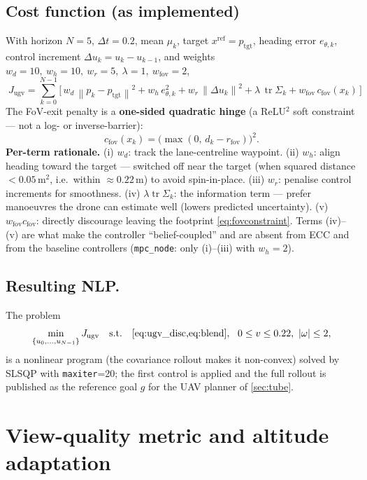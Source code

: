\documentclass[11pt]{article}
\DeclareMathOperator{\tr}{tr}
\newcommand{\norm}[1]{\left\lVert #1 \right\rVert}
\newcommand{\code}[1]{\texttt{#1}}
\newcommand{\fov}{\mathrm{fov}}
\begin{document}
\subsection{Cost function (as implemented)}
With horizon $N=5$, $\Delta t=0.2$, mean $\mu_k$, target $x^{\text{ref}}=p_{\text{tgt}}$, heading error
$e_{\theta,k}$, control increment $\Delta u_k=u_k-u_{k-1}$, and weights $w_d=10,\ w_h=10,\ w_r=5,\ \lambda=1,\
w_{\fov}=2$,
\begin{equation}
\boxed{\;
J_{\text{ugv}} = \sum_{k=0}^{N-1}\Big[\,
w_d\,\norm{p_k-p_{\text{tgt}}}^2
+ w_h\,e_{\theta,k}^2
+ w_r\,\norm{\Delta u_k}^2
+ \lambda\,\tr\Sigma_k
+ w_{\fov}\,c_{\fov}(x_k)\,\Big]\;}
\label{eq:ugvcost}
\end{equation}
The FoV-exit penalty is a \textbf{one-sided quadratic hinge} (a ReLU$^2$ soft constraint --- not a log- or
inverse-barrier):
\begin{equation}
c_{\fov}(x_k) = \big(\max(0,\,d_k-r_{\fov})\big)^2 .
\label{eq:cfov}
\end{equation}
\textbf{Per-term rationale.} (i) $w_d$: track the lane-centreline waypoint. (ii) $w_h$: align heading toward
the target --- switched off near the target (when squared distance $<0.05$\,m$^2$, i.e.\ within $\approx0.22$\,m)
to avoid spin-in-place. (iii) $w_r$: penalise control increments for smoothness. (iv) $\lambda\tr\Sigma_k$:
the information term --- prefer manoeuvres the drone can estimate well (lowers predicted uncertainty).
(v) $w_{\fov}c_{\fov}$: directly discourage leaving the footprint \cref{eq:fovconstraint}. Terms (iv)--(v)
are what make the controller ``belief-coupled'' and are absent from ECC and from the baseline controllers
(\code{mpc\_node}: only (i)--(iii) with $w_h=2$).

\subsection{Resulting NLP.} The problem
\[
\min_{\{u_0,\dots,u_{N-1}\}} J_{\text{ugv}}
\quad\text{s.t.}\quad \text{\cref{eq:ugv_disc,eq:blend}},\ \ 0\le v\le0.22,\ |\omega|\le2,
\]
is a nonlinear program (the covariance rollout makes it non-convex) solved by SLSQP
\citep{nocedal2006numerical} with \code{maxiter}=20; the first control is applied and the full rollout is
published as the reference goal $g$ for the UAV planner of \cref{sec:tube}.

\section{View-quality metric and altitude adaptation}
\label{sec:viewquality}
\end{document}
